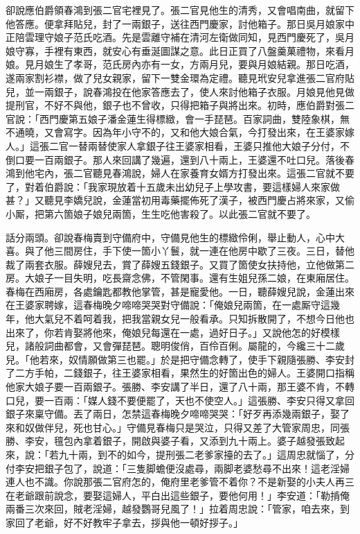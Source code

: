 卻說應伯爵領春鴻到張二官宅裡見了。張二官見他生的清秀，又會唱南曲，就留下他答應。便拿拜貼兒，封了一兩銀子，送往西門慶家，討他箱子。那日吳月娘家中正陪雲理守娘子范氏吃酒。先是雲離守補在清河左衛做同知，見西門慶死了，吳月娘守寡，手裡有東西，就安心有垂涎圖謀之意。{}此日正買了八盤羹菓禮物，來看月娘。見月娘生了孝哥，范氏房內亦有一女，方兩月兒，要與月娘結親。那日吃酒，遂兩家割衫襟，做了兒女親家，留下一雙金環為定禮。聽見玳安兒拿進張二官府貼兒，並一兩銀子，說春鴻投在他家答應去了，使人來討他箱子衣服。月娘見他見做提刑官，不好不與他，銀子也不曾收，只得把箱子與將出來。初時，應伯爵對張二官說：「西門慶第五娘子潘金蓮生得標緻，會一手琵琶。百家詞曲，雙陸象棋，無不通曉，又會寫字。因為年小守不的，又和他大娘合氣，今打發出來，在王婆家嫁人。」這張二官一替兩替使家人拿銀子往王婆家相看，王婆只推他大娘子分付，不倒口要一百兩銀子。那人來回講了幾遍，還到八十兩上，王婆還不吐口兒。落後春鴻到他宅內，張二官聽見春鴻說，婦人在家養育女婿方打發出來。這張二官就不要了，對着伯爵說：「我家現放着十五歲未出幼兒子上學攻書，要這樣婦人來家做甚？」又聽見李嬌兒說，{}金蓮當初用毒藥擺佈死了漢子，被西門慶占將來家，又偷小厮，把第六箇娘子娘兒兩箇，生生吃他害殺了。以此張二官就不要了。

話分兩頭。卻說春梅賣到守備府中，守備見他生的標緻伶俐，舉止動人，心中大喜。與了他三間房住，手下使一箇小丫鬟，就一連在他房中歇了三夜。三日，替他裁了兩套衣服。薛嫂兒去，賞了薛嫂五錢銀子。又買了箇使女扶持他，立他做第二房。大娘子一目失明，吃長齋念佛，不管閑事。還有生姐兒孫二娘，在東廂居住。春梅在西廂房，各處鑰匙都教他掌管，甚是寵愛他。一日，聽薛嫂兒說，金蓮出來在王婆家聘嫁，這春梅晚夕啼啼哭哭對守備說：「俺娘兒兩箇，在一處厮守這幾年，他大氣兒不着呵着我，把我當親女兒一般看承。只知拆散開了，不想今日他也出來了，你若肯娶將他來，俺娘兒每還在一處，過好日子。」又說他怎的好模樣兒，諸般詞曲都會，又會彈琵琶。聰明俊俏，百伶百俐。屬龍的，今纔三十二歲兒。「他若來，奴情願做第三也罷。」{}於是把守備念轉了，使手下親隨張勝、李安封了二方手帕，二錢銀子，往王婆家相看，果然生的好箇出色的婦人。王婆開口指稱他家大娘子要一百兩銀子。張勝、李安講了半日，還了八十兩，那王婆不肯，不轉口兒，要一百兩：「媒人錢不要便罷了，天也不使空人。」{}這張勝、李安只得又拿回銀子來稟守備。丟了兩日，怎禁這春梅晚夕啼啼哭哭：「好歹再添幾兩銀子，娶了來和奴做伴兒，死也甘心。」守備見春梅只是哭泣，只得又差了大管家周忠，同張勝、李安，氊包內拿着銀子，開啟與婆子看，又添到九十兩上。婆子越發張致起來，說：「若九十兩，到不的如今，提刑張二老爹家擡的去了。」這周忠就惱了，分付李安把銀子包了，說道：「三隻脚蟾便沒處尋，兩脚老婆愁尋不出來！這老淫婦連人也不識。你說那張二官府怎的，俺府里老爹管不着你？不是新娶的小夫人再三在老爺跟前說念，要娶這婦人，平白出這些銀子，要他何用！」李安道：「勒掯俺兩番三次來回，賊老淫婦，越發鸚哥兒風了！」拉着周忠說：「管家，咱去來，到家回了老爺，好不好教牢子拿去，拶與他一頓好拶子。」

